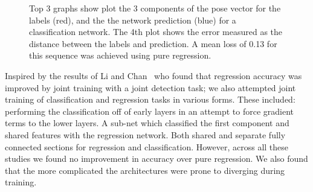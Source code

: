 \documentclass[11pt]{article} %
\begin{document}
\begin{figure}
\centering
{}%
\qquad
{}%
\caption{Top 3 graphs show plot the 3 components of the pose vector for the labels (red), and the the network prediction (blue) for a classification network. The 4th plot shows the error measured as the distance between the labels and prediction. A mean loss of 0.13 for this sequence was achieved using pure regression.  }
\label{fig:classesRes}
\end{figure}

Inspired by the results of Li and Chan~\cite{Li2014} who found that regression accuracy was improved by joint training with a joint detection task; we also attempted joint training of classification and regression tasks in various forms.  These included: performing the classification off of early layers in an attempt to force gradient terms to the lower layers. A sub-net which classified the first component and shared features with the regression network. Both shared and separate fully connected sections for regression and classification. However, across all these studies we found no improvement in accuracy over pure regression. We also found that the more complicated the architectures were prone to diverging during training. 
\end{document}
